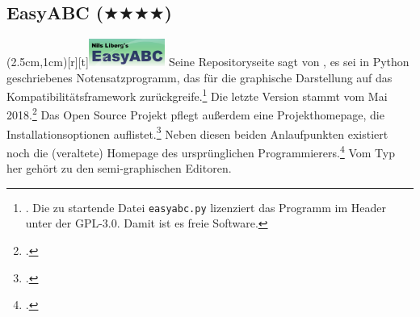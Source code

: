 %
%
%



\subsection{EasyABC ($\bigstar\bigstar\bigstar\bigstar$)}

\parpic(2.5cm,1cm)[r][t]{\includegraphics[width=2.5cm]{logos/easyabc-300dpi.png}}
\label{EasyABC}Seine Repositoryseite sagt von , es sei in Python
geschriebenes Notensatzprogramm, das für die graphische Darstellung auf das
Kompatibilitätsframework 
zurückgreife.\footnote{\cite[vgl.][\nopage wp.]{EasyAbc2017a}. Die zu startende
Datei \texttt{easyabc.py} lizenziert das Programm im Header unter der GPL-3.0.
Damit ist es freie Software.} Die letzte Version stammt vom Mai
2018.\footcite[vgl.][\nopage wp.]{EasyAbc2017c} Das Open Source Projekt pflegt
außerdem eine Projekthomepage, die Installationsoptionen
auflistet.\footcite[vgl.][\nopage wp.]{EasyAbc2017b} Neben diesen beiden
Anlaufpunkten existiert noch die (veraltete) Homepage des ursprünglichen
Programmierers.\footcite[vgl.][\nopage wp.]{Liberg2015a} Vom Typ her gehört
 zu den semi-graphischen Editoren.

